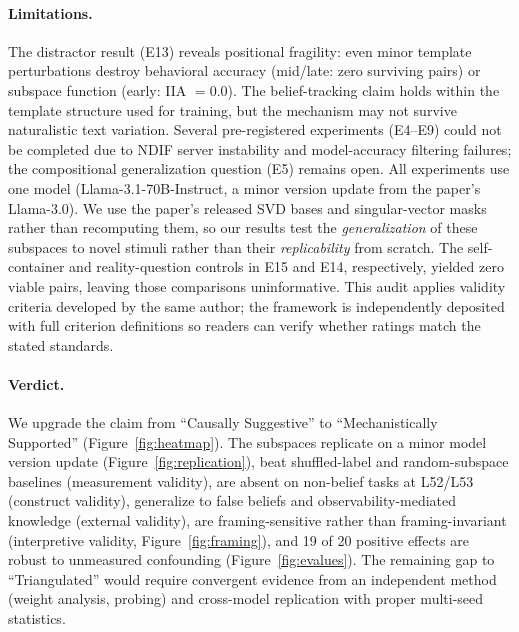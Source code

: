 \documentclass[11pt]{article}
\begin{document}
\paragraph{Limitations.}
The distractor result (E13) reveals positional fragility: even minor template perturbations destroy behavioral accuracy (mid/late: zero surviving pairs) or subspace function (early: IIA $= 0.0$). The belief-tracking claim holds within the template structure used for training, but the mechanism may not survive naturalistic text variation. Several pre-registered experiments (E4--E9) could not be completed due to NDIF server instability and model-accuracy filtering failures; the compositional generalization question (E5) remains open. All experiments use one model (Llama-3.1-70B-Instruct, a minor version update from the paper's Llama-3.0). We use the paper's released SVD bases and singular-vector masks rather than recomputing them, so our results test the \emph{generalization} of these subspaces to novel stimuli rather than their \emph{replicability} from scratch. The self-container and reality-question controls in E15 and E14, respectively, yielded zero viable pairs, leaving those comparisons uninformative. This audit applies validity criteria developed by the same author; the framework is independently deposited with full criterion definitions so readers can verify whether ratings match the stated standards.

\paragraph{Verdict.}
We upgrade the claim from ``Causally Suggestive'' to ``Mechanistically Supported'' (Figure~\ref{fig:heatmap}). The subspaces replicate on a minor model version update (Figure~\ref{fig:replication}), beat shuffled-label and random-subspace baselines (measurement validity), are absent on non-belief tasks at L52/L53 (construct validity), generalize to false beliefs and observability-mediated knowledge (external validity), are framing-sensitive rather than framing-invariant (interpretive validity, Figure~\ref{fig:framing}), and 19 of 20 positive effects are robust to unmeasured confounding (Figure~\ref{fig:evalues}). The remaining gap to ``Triangulated'' would require convergent evidence from an independent method (weight analysis, probing) and cross-model replication with proper multi-seed statistics.
\end{document}
